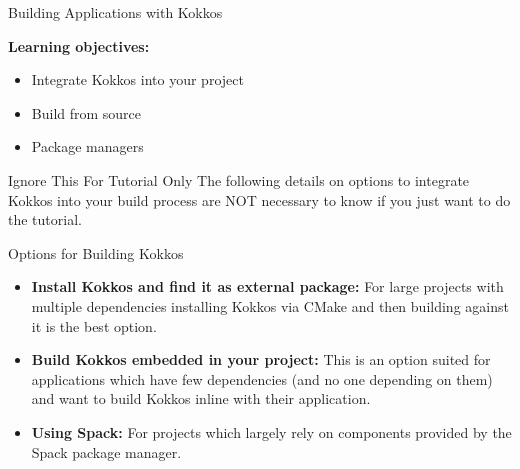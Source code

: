 



\begin{frame}[fragile]


  \vspace{10pt}
  {\Huge Building Applications with Kokkos}

  \vspace{10pt}

  \textbf{Learning objectives:}
  \begin{itemize}
    \item{Integrate Kokkos into your project}
    \item{Build from source}
    \item{Package managers}
  \end{itemize}

  \pause

  \begin{block}{Ignore This For Tutorial Only}
     The following details on options to integrate Kokkos into your build process are NOT necessary to know if you just want to do the tutorial.
  \end{block}

\end{frame}

\begin{frame}[fragile]{Options for Building Kokkos}

\begin{itemize}
\item \textbf{Install Kokkos and find it as external package:} For large projects with multiple dependencies installing Kokkos via CMake and then building against it is the best option.
\item \textbf{Build Kokkos embedded in your project:} This is an option suited for applications which have few dependencies (and no one depending on them) and want to build Kokkos inline with their application.
\item \textbf{Using Spack:} For projects which largely rely on components provided by the Spack package manager.
\end{itemize}
\end{frame}

